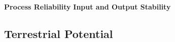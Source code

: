 \documentclass{report}
\begin{document}
\textbf{Process Reliability}
\textbf{Input and Output Stability}

\subsection{Terrestrial Potential}

\end{document}
